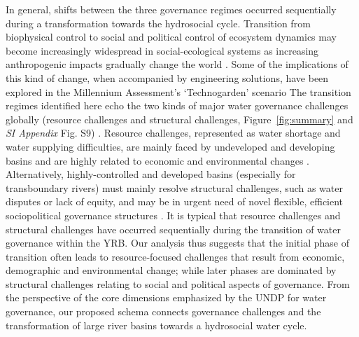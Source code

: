 \documentclass[9pt, twocolumn, twoside, lineno]{pnas-new}
\begin{document}
In general, shifts between the three governance regimes occurred sequentially during a transformation towards the hydrosocial cycle.
Transition from biophysical control to social and political control of ecosystem dynamics may become increasingly widespread in social-ecological systems as increasing anthropogenic impacts gradually change the world  
\cite{best2020,cummingLinkingEconomicGrowth2018,cummingImplicationsAgriculturalTransitions2014}.
Some of the implications of this kind of change, when accompanied by engineering solutions, have been explored in the Millennium Assessment’s `Technogarden' scenario 
The transition regimes identified here echo the two kinds of major water governance challenges globally (resource challenges and structural challenges, Figure~\ref{fig:summary} and \textit{SI Appendix} Fig. S9)
\cite{singh2019,porcher2019}.
Resource challenges, represented as water shortage and water supplying difficulties, are mainly faced by undeveloped and developing basins and are highly related to economic and environmental changes
\cite{allan2019,florke2018,liu2012}. 
Alternatively, highly-controlled and developed basins (especially for transboundary rivers) must mainly resolve structural challenges, such as water disputes or lack of equity, and may be in urgent need of novel flexible, efficient sociopolitical governance structures 
\cite{kitroeff2020,roobavannan2017,unep-dhi2016}.
It is typical that resource challenges and structural challenges have occurred sequentially during the transition of water governance within the YRB. 
Our analysis thus suggests that the initial phase of transition often leads to resource-focused challenges that result from economic, demographic and environmental change; while later phases are dominated by structural challenges relating to social and political aspects of governance.
From the perspective of the core dimensions emphasized by the UNDP for water governance, our proposed schema connects governance challenges and the transformation of large river basins towards a hydrosocial water cycle. 
\end{document}
